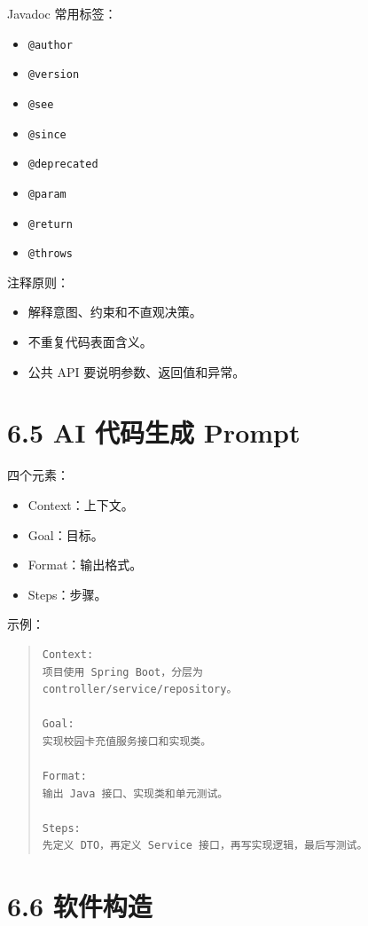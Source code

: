 \documentclass[UTF8,zihao=-4]{ctexart}
\begin{document}
Javadoc 常用标签：

\begin{itemize}
\item \texttt{@author}
\item \texttt{@version}
\item \texttt{@see}
\item \texttt{@since}
\item \texttt{@deprecated}
\item \texttt{@param}
\item \texttt{@return}
\item \texttt{@throws}
\end{itemize}

注释原则：

\begin{itemize}
\item 解释意图、约束和不直观决策。
\item 不重复代码表面含义。
\item 公共 API 要说明参数、返回值和异常。
\end{itemize}

\section{6.5 AI 代码生成 Prompt}

四个元素：

\begin{itemize}
\item Context：上下文。
\item Goal：目标。
\item Format：输出格式。
\item Steps：步骤。
\end{itemize}

示例：

\begin{quote}
\footnotesize
\begin{verbatim}
Context:
项目使用 Spring Boot，分层为 
controller/service/repository。

Goal:
实现校园卡充值服务接口和实现类。

Format:
输出 Java 接口、实现类和单元测试。

Steps:
先定义 DTO，再定义 Service 接口，再写实现逻辑，最后写测试。
\end{verbatim}
\end{quote}

\section{6.6 软件构造}
\end{document}
